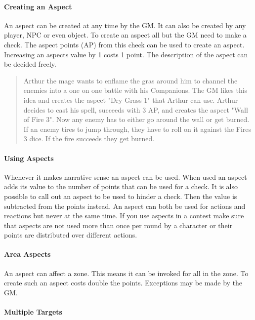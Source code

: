 \documentclass[11pt]{article}
\begin{document}
{\paragraph*{Creating an Aspect}
\label{sec:org4dc7e3f}

An aspect can be created at any time by the GM. It can also be created by any player, NPC or even object. To create an aspect all but the GM need to make a check. The aspect points (AP) from this check can be used to create an aspect. Increasing an aspects value by 1 costs 1 point. The description of the aspect can be decided freely. 

\begin{quote}
Arthur the mage wants to enflame the gras around him to channel the enemies into a one on one battle with his Companions. The GM likes this idea and creates the aspect "Dry Grass 1" that Arthur can use. Arthur decides to cast his spell, succeeds with 3 AP, and creates the aspect "Wall of Fire 3". Now any enemy has to either go around the wall or get burned. If an enemy tires to jump through, they have to roll on it against the Fires 3 dice. If the fire succeeds they get burned.
\end{quote}

\paragraph*{Using Aspects}
\label{sec:orgde0d765}

Whenever it makes narrative sense an aspect can be used. When used an aspect adds its value to the number of points that can be used for a check. It is also possible to call out an aspect to be used to hinder a check. Then the value is subtracted from the points instead. An aspect can both be used for actions and reactions but never at the same time. If you use aspects in a contest make sure that aspects are not used more than once per round by a character or their points are distributed over different actions.

\paragraph*{Area Aspects}
\label{sec:orgbe93062}

An aspect can affect a zone. This means it can be invoked for all in the zone. To create such an aspect costs double the points. Exceptions may be made by the GM. 

\paragraph*{Multiple Targets}
\label{sec:org3046abd}

}
\end{document}
